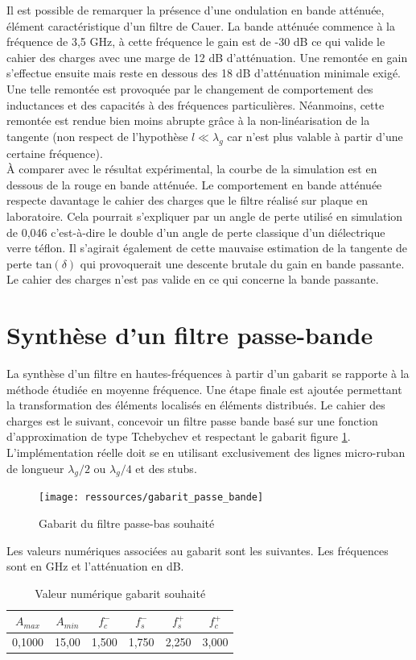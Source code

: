 \documentclass[french]{article}
\begin{document}
Il est possible de remarquer la présence d'une ondulation en bande atténuée, élément caractéristique d'un filtre de Cauer. La bande atténuée commence à la fréquence de 3,5 GHz, à cette fréquence le gain est de -30 dB ce qui valide le cahier des charges avec une marge de 12 dB d'atténuation. Une remontée en gain s'effectue ensuite mais reste en dessous des 18 dB d'atténuation minimale exigé. Une telle remontée est provoquée par le changement de comportement des inductances et des capacités à des fréquences particulières. Néanmoins, cette remontée est rendue bien moins abrupte grâce à la non-linéarisation de la tangente (non respect de l'hypothèse $l \ll \lambda_g$ car n'est plus valable à partir d'une certaine fréquence).\\
À comparer avec le résultat expérimental, la courbe de la simulation est en dessous de la rouge en bande atténuée. Le comportement en bande atténuée respecte davantage le cahier des charges que le filtre réalisé sur plaque en laboratoire. Cela pourrait s'expliquer par un angle de perte utilisé en simulation de 0,046 c'est-à-dire le double d'un angle de perte classique d'un diélectrique verre téflon. Il s'agirait également de cette mauvaise estimation de la tangente de perte $\mbox{tan}(\delta)$ qui provoquerait une descente brutale du gain en bande passante. Le cahier des charges n'est pas valide en ce qui concerne la bande passante.\\


\newpage

\section{Synthèse d'un filtre passe-bande}

La synthèse d'un filtre en hautes-fréquences à partir d'un gabarit se rapporte à la méthode étudiée en moyenne fréquence. Une étape finale est ajoutée permettant la transformation des éléments localisés en éléments distribués.
Le cahier des charges est le suivant, concevoir un filtre passe bande basé sur une fonction d'approximation de type Tchebychev et respectant le gabarit figure \ref{fig:gab}. L'implémentation réelle doit se en utilisant exclusivement des lignes micro-ruban de longueur $\lambda_g/2$ ou $\lambda_g/4$ et des stubs.

\begin{figure}[H]
	\centering
	\texttt{[image: ressources/gabarit\_passe\_bande]}
	\caption{Gabarit du filtre passe-bas souhaité}
	\label{fig:gab}
\end{figure}
Les valeurs numériques associées au gabarit sont les suivantes. Les fréquences sont en GHz et l'atténuation en dB. 
	\begin{table}[H]
		\centering
\begin{tabular}{|c|c|c|c|c|c|}
		\hline
	$A_{max}$& $A_{min}$ & $f_c^-$ & $f_s^-$ & $f_s^+$ &$f_c^+$ \\ \hline
	0,1000	 & 15,00 		& 1,500	   & 1,750 & 2,250& 3,000 \\ \hline
	\end{tabular}
\caption{Valeur numérique gabarit souhaité}
	\end{table}
\end{document}
